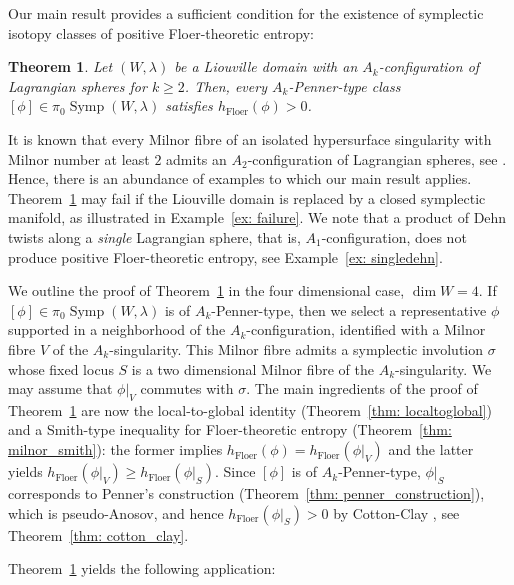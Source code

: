 \documentclass[12pt]{article}
\renewcommand{\ge}{\geqslant}
\theoremstyle{theorem}
\newtheorem{TheoremA}{Theorem}
\newtheorem{CorollaryA}{Corollary}
\theoremstyle{definition}
\theoremstyle{remark}
\numberwithin{equation}{section}
\DeclareMathOperator{\floer}{Floer}
\DeclareMathOperator{\Symp}{Symp}
\begin{document}
Our main result provides a sufficient condition for the existence of symplectic isotopy classes of positive Floer-theoretic entropy:

\begin{TheoremA}\label{thm: mainthmA}
Let $(W,\lambda)$ be a Liouville domain with an $A_k$-configuration of Lagrangian spheres for $k\ge 2$.
Then, every $A_k$-Penner-type class $[\phi]\in \pi_0\Symp(W,\lambda)$ satisfies $h_{\floer}(\phi)>0$.
\end{TheoremA}
It is known that every Milnor fibre of an isolated hypersurface singularity with Milnor number at least $2$ admits an $A_2$-configuration of Lagrangian spheres, see \cite[Lemma~9.9 and Lemma~9.11]{Ke14}.
Hence, there is an abundance of examples to which our main result applies.
Theorem~\ref{thm: mainthmA} may fail if the Liouville domain is replaced by a closed symplectic manifold, as illustrated in Example~\ref{ex: failure}.
We note that a product of Dehn twists along a \emph{single} Lagrangian sphere, that is, $A_1$-configuration, does not produce positive Floer-theoretic entropy, see Example~\ref{ex: singledehn}.

We outline the proof of Theorem~\ref{thm: mainthmA} in the four dimensional case, $\dim W=4$.
If $[\phi]\in\pi_0\Symp(W,\lambda)$ is of $A_k$-Penner-type, then we select a representative $\phi$ supported in a neighborhood of the $A_k$-configuration, identified with a Milnor fibre $V$ of the $A_k$-singularity.
This Milnor fibre admits a symplectic involution $\sigma$ whose fixed locus $S$ is a two dimensional Milnor fibre of the $A_k$-singularity.
We may assume that $\phi|_V$ commutes with $\sigma$.
The main ingredients of the proof of Theorem~\ref{thm: mainthmA} are now the local-to-global identity (Theorem~\ref{thm: localtoglobal}) and a Smith-type inequality for Floer-theoretic entropy (Theorem~\ref{thm: milnor_smith}):
the former implies $h_{\floer}(\phi)=h_{\floer}(\phi|_V)$ and the latter yields $h_{\floer}(\phi|_V)\ge h_{\floer}(\phi|_S)$.
Since $[\phi]$ is of $A_k$-Penner-type, $\phi|_S$ corresponds to Penner's construction (Theorem~\ref{thm: penner_construction}), which is pseudo-Anosov, and hence $h_{\floer}(\phi|_S)>0$ by Cotton-Clay \cite{Co09}, see Theorem~\ref{thm: cotton_clay}.

Theorem~\ref{thm: mainthmA} yields the following application:


\end{document}
